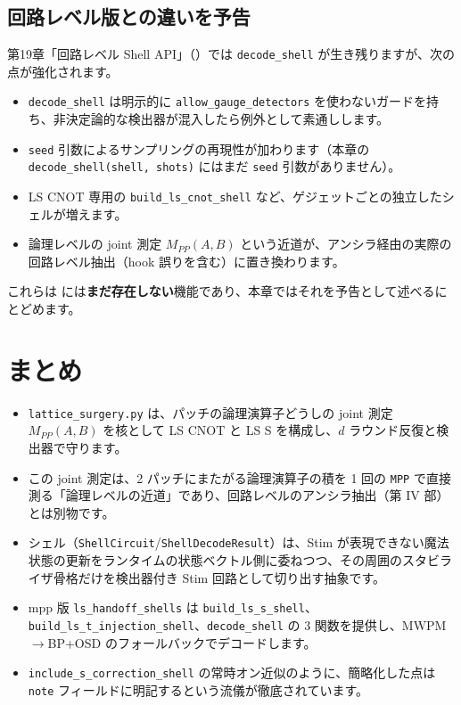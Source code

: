 \subsection{回路レベル版との違いを予告}\label{subsec:preview_circuit_level}

第19章「回路レベル Shell API」（）では \texttt{decode\_shell} が生き残りますが、次の点が強化されます。

\begin{itemize}
  \item \texttt{decode\_shell} は明示的に \texttt{allow\_gauge\_detectors} を使わないガードを持ち、非決定論的な検出器が混入したら例外として素通しします。
  \item \texttt{seed} 引数によるサンプリングの再現性が加わります（本章の \texttt{decode\_shell(shell, shots)} にはまだ \texttt{seed} 引数がありません）。
  \item LS CNOT 専用の \texttt{build\_ls\_cnot\_shell} など、ゲジェットごとの独立したシェルが増えます。
  \item 論理レベルの joint 測定 $M_{PP}(A,B)$ という近道が、アンシラ経由の実際の回路レベル抽出（hook 誤りを含む）に置き換わります。
\end{itemize}

これらは  には\textbf{まだ存在しない}機能であり、本章ではそれを予告として述べるにとどめます。

\section{まとめ}\label{ch11:summary}

\begin{itemize}
  \item \texttt{lattice\_surgery.py} は、パッチの論理演算子どうしの joint 測定 $M_{PP}(A,B)$ を核として LS CNOT と LS S を構成し、$d$ ラウンド反復と検出器で守ります。
  \item この joint 測定は、2 パッチにまたがる論理演算子の積を 1 回の \texttt{MPP} で直接測る「論理レベルの近道」であり、回路レベルのアンシラ抽出（第 IV 部）とは別物です。
  \item シェル（\texttt{ShellCircuit}/\texttt{ShellDecodeResult}）は、Stim が表現できない魔法状態の更新をランタイムの状態ベクトル側に委ねつつ、その周囲のスタビライザ骨格だけを検出器付き Stim 回路として切り出す抽象です。
  \item mpp 版 \texttt{ls\_handoff\_shells} は \texttt{build\_ls\_s\_shell}、\texttt{build\_ls\_t\_injection\_shell}、\texttt{decode\_shell} の 3 関数を提供し、MWPM$\to$BP+OSD のフォールバックでデコードします。
  \item \texttt{include\_s\_correction\_shell} の常時オン近似のように、簡略化した点は \texttt{note} フィールドに明記するという流儀が徹底されています。
\end{itemize}

